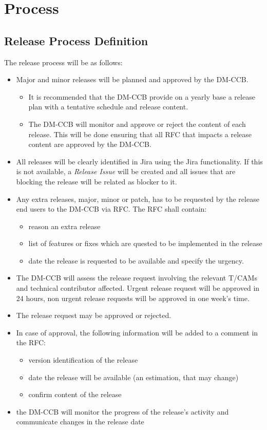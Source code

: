 \section{Process} \label{sec:process}

\subsection{Release Process Definition}

The release process will be as follows:

\begin{itemize}
\item Major and minor releases will be planned and approved by the DM-CCB. 
\begin{itemize}
  \item It is recommended that the DM-CCB provide on a yearly base a release plan with a tentative schedule and release content.
  \item The DM-CCB will monitor and approve or reject the content of each release. This will be done ensuring that all RFC that impacts a release content are approved by the DM-CCB.
\end{itemize}
\item All releases will be clearly identified in Jira using the Jira functionality. 
If this is not available, a {\it Release Issue} will be created and all issues that are blocking the release will be related as blocker to it. 
\item Any extra releases, major, minor or patch, has to be requested by the release end users to the DM-CCB via RFC. The RFC shall contain:
\begin{itemize}
  \item reason an extra release
  \item list of features or fixes which are quested to be implemented in the release
  \item date the release is requested to be available and specify the urgency.
\end{itemize}
\item The DM-CCB will assess the release request involving the relevant T/CAMs and technical contributor affected. 
Urgent release request will be approved in 24 hours, non urgent release requests will be approved in one week's time.
\item The release request may be approved or rejected.
\item In case of approval, the following information will be added to a comment in the RFC:
\begin{itemize}
  \item version identification of the release
  \item date the release will be available (an estimation, that may change)
  \item confirm content of the release
\end{itemize}
\item the DM-CCB will monitor the progress of the release's activity and communicate changes in the release date
\end{itemize}


